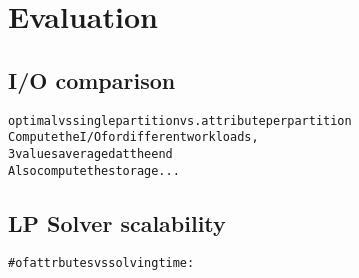 \section{Evaluation}

\subsection{I/O comparison}
\begin{alltt}\scriptsize
optimal vs single partition vs. attribute per partition
Compute the I/O for different workloads,
3 values averaged at the end
Also compute the storage...
\end{alltt}

\subsection{LP Solver scalability}
\begin{alltt}\scriptsize
# of attrbutes vs solving time:
\end{alltt}